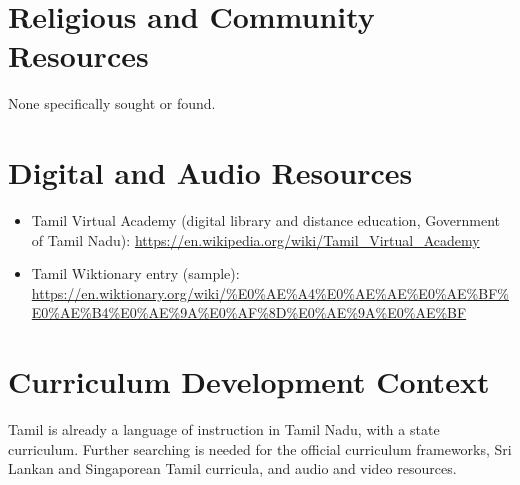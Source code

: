 \documentclass[12pt]{article}
\begin{document}
\section{Religious and Community Resources}
None specifically sought or found.
\section{Digital and Audio Resources}
\begin{itemize}
\item Tamil Virtual Academy (digital library and distance education, Government of Tamil Nadu): \url{https://en.wikipedia.org/wiki/Tamil_Virtual_Academy}
\item Tamil Wiktionary entry (sample): \url{https://en.wiktionary.org/wiki/%E0%AE%A4%E0%AE%AE%E0%AE%BF%E0%AE%B4%E0%AE%9A%E0%AF%8D%E0%AE%9A%E0%AE%BF}
\end{itemize}
\section{Curriculum Development Context}
Tamil is already a language of instruction in Tamil Nadu, with a state curriculum. Further searching is needed for the official curriculum frameworks, Sri Lankan and Singaporean Tamil curricula, and audio and video resources.
\end{document}
